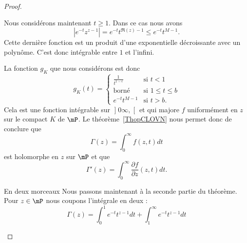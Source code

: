 \begin{proof}
\begin{subproof}
            Nous considérons maintenant \( t\geq 1\). Dans ce cas nous avons
            \begin{equation}
                |  e^{-t}z^{z-1} |= e^{-t}t^{\Re(z)-1}\leq  e^{-t}t^{M-1}.
            \end{equation}
            Cette dernière fonction est un produit d'une exponentielle décroissante avec un polynôme. C'est donc intégrable entre \( 1\) et l'infini.

            La fonction \( g_K\) que nous considérons est donc
            \begin{equation}
                g_K(t)=\begin{cases}
                    \frac{1}{ t^{1-\epsilon} }    &   \text{si } t<1\\
                    \text{borné}    &    \text{si } 1\leq t\leq b\\
                    e^{-t}t^{M-1}    &    \text{si } t>b.
                \end{cases}
            \end{equation}
            Cela est une fonction intégrable sur \( \mathopen] 0    \infty ,  \mathclose[\) et qui majore \( f\) uniformément en \( z\) sur le compact \( K\) de \( \mP\). Le théorème~\ref{ThopCLOVN} nous permet donc de conclure que
            \begin{equation}
                \Gamma(z)=\int_0^{\infty}f(z,t)dt
            \end{equation}
            est holomorphe en \( z\) sur \( \mP\) et que
            \begin{equation}
                \Gamma'(z)=\int_0^{\infty}\frac{ \partial f }{ \partial z }(z,t)dt.
            \end{equation}

        \item[En deux morceaux] Nous passons maintenant à la seconde partie du théorème. Pour \( z\in \mP\) nous coupons l'intégrale en deux :
            \begin{equation}
                \Gamma(z)=\int_0^1 e^{-t}t^{z-1}dt+\int_1^{\infty} e^{-t}t^{z-1}dt
            \end{equation}


\end{subproof}
\end{proof}

